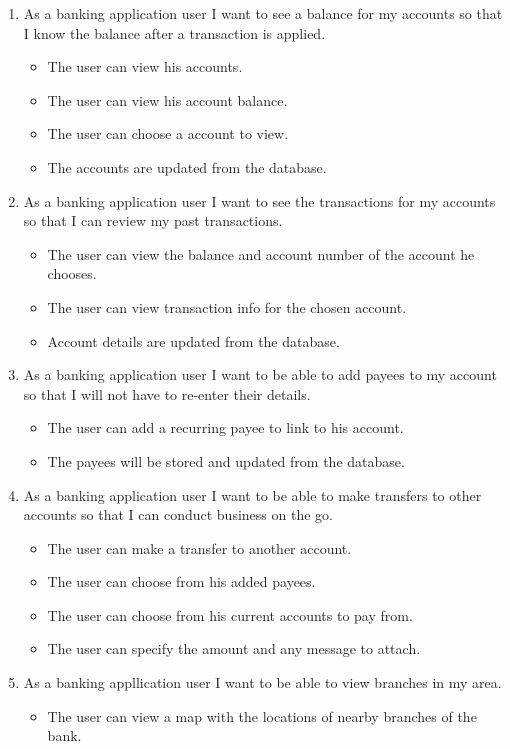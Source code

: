 \begin{itemize}
        \begin{enumerate}
        \item As a banking application user I want to see a balance for my accounts so that I know the balance after a transaction is applied. \cite{userStories}
            \begin{itemize}
                \item The user can view his accounts.
                \item The user can view his account balance.
                \item The user can choose a account to view.
                \item The accounts are updated from the database.
            \end{itemize}
        \item As a banking application user I want to see the transactions for my accounts so that I can review my past transactions.
            \begin{itemize}
                \item The user can view the balance and account number of the account he chooses.
                \item The user can view transaction info for the chosen account.
                \item Account details are updated from the database.
            \end{itemize}
        \item As a banking application user I want to be able to add payees to my account so that I will not have to re-enter their details.
            \begin{itemize}
                \item The user can add a recurring payee to link to his account.
                \item The payees will be stored and updated from the database.
            \end{itemize}
        \item As a banking application user I want to be able to make transfers to other accounts so that I can conduct business on the go.
            \begin{itemize}
                \item The user can make a transfer to another account.
                \item The user can choose from his added payees.
                \item The user can choose from his current accounts to pay from.
                \item The user can specify the amount and any message to attach.
            \end{itemize}
        \item As a banking appllication user I want to be able to view branches in my area.
            \begin{itemize}
                \item The user can view a map with the locations of nearby branches of the bank.
            \end{itemize}
        \end{enumerate}
    \end{itemize}


